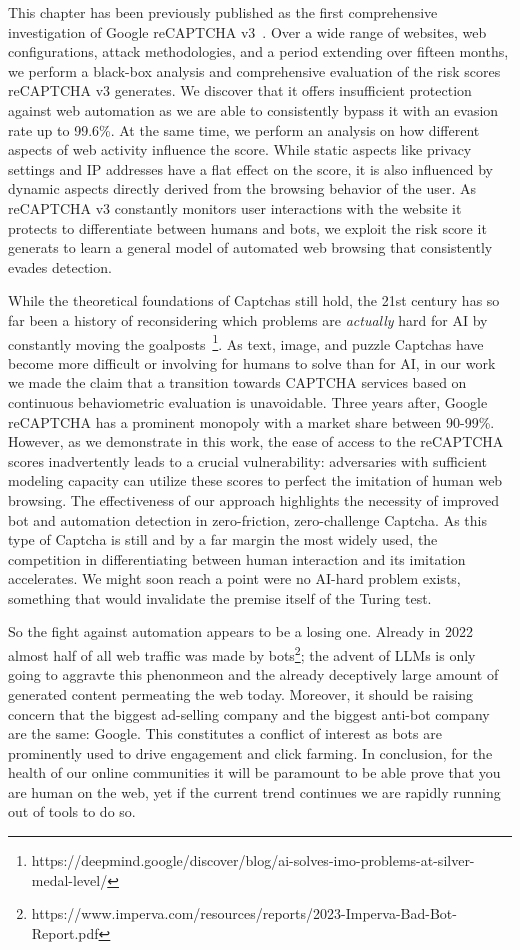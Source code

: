 This chapter has been previously published as the first comprehensive investigation of Google reCAPTCHA v3~\cite{tsingenopoulos2022captcha}.
Over a wide range of websites, web configurations, attack methodologies, and a period extending over fifteen months, we perform a black-box analysis and comprehensive evaluation of the risk scores reCAPTCHA v3 generates.
We discover that it offers insufficient protection against web automation as we are able to consistently bypass it with an evasion rate up to 99.6\%.
At the same time, we perform an analysis on how different aspects of web activity influence the score.
While static aspects like privacy settings and IP addresses have a flat effect on the score, it is also influenced by dynamic aspects directly derived from the browsing behavior of the user.
As reCAPTCHA v3 constantly monitors user interactions with the website it protects to differentiate between humans and bots, we exploit the risk score it generats to learn a general model of automated web browsing that consistently evades detection.

While the theoretical foundations of Captchas still hold, the 21st century has so far been a history of reconsidering which problems are \textit{actually} hard for AI by constantly moving the goalposts~\footnote{https://deepmind.google/discover/blog/ai-solves-imo-problems-at-silver-medal-level/}.
As text, image, and puzzle Captchas have become more difficult or involving for humans to solve than for AI, in our work we made the claim that a transition towards CAPTCHA services based on continuous behaviometric evaluation is unavoidable.
Three years after, Google reCAPTCHA has a prominent monopoly with a market share between 90-99\%.
However, as we demonstrate in this work, the ease of access to the reCAPTCHA scores inadvertently leads to a crucial vulnerability: adversaries with sufficient modeling capacity can utilize these scores to perfect the imitation of human web browsing.
The effectiveness of our approach highlights the necessity of improved bot and automation detection in zero-friction, zero-challenge Captcha.
As this type of Captcha is still and by a far margin the most widely used, the competition in differentiating between human interaction and its imitation accelerates.
We might soon reach a point were no AI-hard problem exists, something that would invalidate the premise itself of the Turing test.

So the fight against automation appears to be a losing one.
Already in 2022 almost half of all web traffic was made by bots\footnote{https://www.imperva.com/resources/reports/2023-Imperva-Bad-Bot-Report.pdf}; the advent of LLMs is only going to aggravte this phenonmeon and the already deceptively large amount of generated content permeating the web today.
Moreover, it should be raising concern that the biggest ad-selling company and the biggest anti-bot company are the same: Google.
This constitutes a conflict of interest as bots are prominently used to drive engagement and click farming.
In conclusion, for the health of our online communities it will be paramount to be able prove that you are human on the web, yet if the current trend continues we are rapidly running out of tools to do so.

